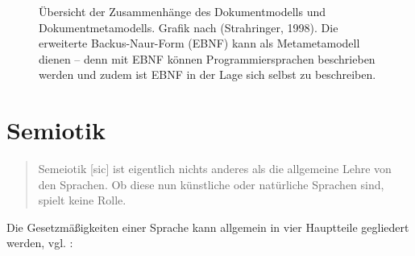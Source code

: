  
\begin{figure}[h!]
\centering
\advance\leftskip-2.5cm
\caption{ Übersicht der Zusammenhänge des Dokumentmodells und Dokumentmetamodells. Grafik nach (Strahringer, 1998). Die erweiterte Backus-Naur-Form (EBNF) kann als Metametamodell dienen -- denn mit EBNF können Programmiersprachen beschrieben werden und zudem ist EBNF in der Lage sich selbst zu beschreiben. }\label{metamodellschema}
\end{figure}
 
\section{Semiotik}\label{}
 
\begin{quote}
 Semeiotik [sic] ist eigentlich nichts anderes als die allgemeine Lehre von den Sprachen. Ob diese nun künstliche oder natürliche Sprachen sind, spielt keine Rolle. \citep[S.~8]{Malissa}
\end{quote}
 
Die Gesetzmäßigkeiten einer Sprache kann allgemein in vier Hauptteile gegliedert werden, vgl. \citep[S.~8]{Malissa}:

